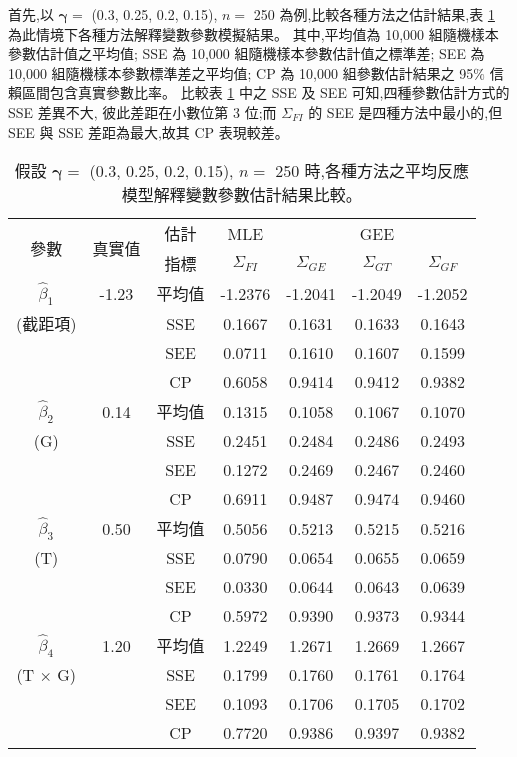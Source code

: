 首先,以 $\bm{\gamma}=$ (0.3, 0.25, 0.2, 0.15),  $n=$ 250 為例,比較各種方法之估計結果,表 \ref{tab:est_sd250} 為此情境下各種方法解釋變數參數模擬結果。
其中,平均值為 10,000 組隨機樣本參數估計值之平均值; SSE 為 10,000 組隨機樣本參數估計值之標準差; SEE 為 10,000 組隨機樣本參數標準差之平均值;
CP 為 10,000 組參數估計結果之 95$\%$ 信賴區間包含真實參數比率。
比較表 \ref{tab:est_sd250} 中之 SSE 及 SEE 可知,四種參數估計方式的 SSE 差異不大,
彼此差距在小數位第 3 位;而 $\Sigma_{FI}$ 的 SEE 是四種方法中最小的,但 SEE 與 SSE 差距為最大,故其 CP 表現較差。

\begin{table}[hbt]
    \centering
    \extrarowheight=2pt
    \caption{假設 $\bm{\gamma}=$ (0.3, 0.25, 0.2, 0.15), $n=$ 250 時,各種方法之平均反應模型解釋變數參數估計結果比較。}\label{tab:est_sd250}
    \begin{tabular}{ccc|cccc}
    \toprule
\multirow{2}{*}{參數}   &\multirow{2}{*}{真實值}  &估計   & MLE              &   \multicolumn{3}{c}{GEE}         \\\cline{5-7}
                        &                         &指標   & $\Sigma_{FI}$    & $\Sigma_{GE}$    & $\Sigma_{GT}$    &  $\Sigma_{GF}$    \\[3pt]\hline
$\hat{\beta}_1$   &   -1.23   &   平均值  &   -1.2376 &   -1.2041 &   -1.2049 &   -1.2052 \\
 (截距項)   &       &   SSE &   0.1667  &   0.1631  &   0.1633  &   0.1643  \\
            &       &   SEE &   0.0711  &   0.1610  &   0.1607  &   0.1599  \\
            &       &   CP  &   0.6058  &   0.9414  &   0.9412  &   0.9382  \\
$\hat{\beta}_2$   &   0.14    &   平均值  &   0.1315  &   0.1058  &   0.1067  &   0.1070  \\
(G)         &       &   SSE &   0.2451  &   0.2484  &   0.2486  &   0.2493  \\
            &       &   SEE &   0.1272  &   0.2469  &   0.2467  &   0.2460  \\
            &       &   CP  &   0.6911  &   0.9487  &   0.9474  &   0.9460  \\
$\hat{\beta}_3$   &   0.50    &   平均值  &   0.5056  &   0.5213  &   0.5215  &   0.5216  \\
(T)         &       &   SSE &   0.0790  &   0.0654  &   0.0655  &   0.0659  \\
            &       &   SEE &   0.0330  &   0.0644  &   0.0643  &   0.0639  \\
            &       &   CP  &   0.5972  &   0.9390  &   0.9373  &   0.9344  \\
$\hat{\beta}_4$   &   1.20    &   平均值  &   1.2249  &   1.2671  &   1.2669  &   1.2667  \\
(T $\times$ G)  &       &   SSE &   0.1799  &   0.1760  &   0.1761  &   0.1764  \\
            &       &   SEE &   0.1093  &   0.1706  &   0.1705  &   0.1702  \\
            &       &   CP  &   0.7720  &   0.9386  &   0.9397  &   0.9382  \\
    \bottomrule
    \end{tabular}
\end{table}






%


